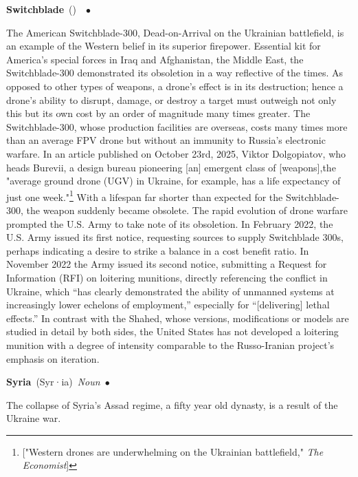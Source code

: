 \documentclass[10pt,a4paper,twoside]{article} %
\newcommand{\entry}[4]{\markboth{#1}{#1}\textbf{#1}\ {(#2)}\ \textit{#3}\ $\bullet$\ {#4}}  %
\begin{document}
\begin{multicols}{2}
\entry{Switchblade} {} {} {The American Switchblade-300, Dead-on-Arrival on the Ukrainian battlefield, is an example of the Western belief in its superior firepower. Essential kit for America's special forces in Iraq and Afghanistan, the Middle East, the Switchblade-300 demonstrated its obsoletion in a way reflective of the times. As opposed to other types of weapons, a drone's effect is in its destruction; hence a drone's ability to disrupt, damage, or destroy a target must outweigh not only this but its own cost by an order of magnitude many times greater. The Switchblade-300, whose production facilities are overseas, costs many times more than an average FPV drone but without an immunity to Russia's electronic warfare. In an article published on October 23rd, 2025, Viktor Dolgopiatov, who heads Burevii, a design bureau pioneering [an] emergent class of [weapons],the "average ground drone (UGV) in Ukraine, for example, has a life expectancy of just one week."\footnote{["Western drones are underwhelming on the Ukrainian battlefield," \emph{The Economist}]} With a lifespan far shorter than expected for the Switchblade-300, the weapon suddenly became obsolete. \newline \indent The rapid evolution of drone warfare prompted the U.S. Army to take note of its obsoletion. In February 2022, the U.S. Army issued its first notice, requesting sources to supply Switchblade 300s, perhaps indicating a desire to strike a balance in a cost benefit ratio. In November 2022 the Army issued its second notice, submitting a Request for Information (RFI) on loitering munitions, directly referencing the conflict in Ukraine, which “has clearly demonstrated the ability of unmanned systems at increasingly lower echelons of employment,” especially for “[delivering] lethal effects.” \newline \indent In contrast with the Shahed, whose versions, modifications or models are studied in detail by both sides, the United States has not developed a loitering munition with a degree of intensity comparable to the Russo-Iranian project's emphasis on iteration. 

}



\entry{Syria} {Syr·ia} {Noun} {
The collapse of Syria's Assad regime, a fifty year old dynasty, is a result of the Ukraine war. 





}


\end{multicols}
\end{document}
